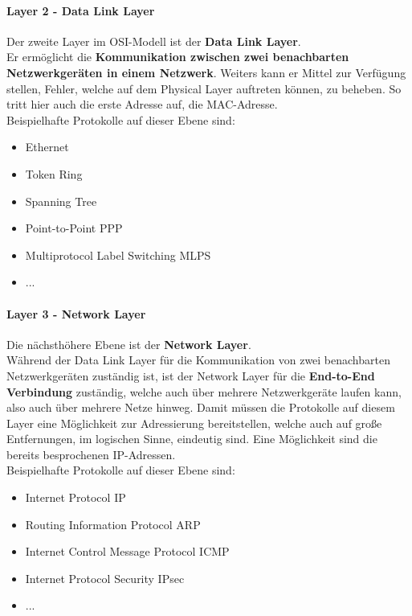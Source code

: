 \documentclass[12pt,a4paper]{report}
\begin{document}
\begin{onehalfspace}
\paragraph{Layer 2 - Data Link Layer}
Der zweite Layer im OSI-Modell ist der \textbf{Data Link Layer}.\\
Er ermöglicht die \textbf{Kommunikation zwischen zwei benachbarten Netzwerkgeräten in einem Netzwerk}. Weiters kann er Mittel zur Verfügung stellen, Fehler, welche auf dem Physical Layer auftreten können, zu beheben. So tritt hier auch die erste Adresse auf, die MAC-Adresse.\\

Beispielhafte Protokolle auf dieser Ebene sind:
\begin{itemize}
\item Ethernet
\item Token Ring
\item Spanning Tree 
\item Point-to-Point PPP
\item Multiprotocol Label Switching MLPS
\item ...
\end{itemize}
\paragraph{Layer 3 - Network Layer}
Die nächsthöhere Ebene ist der \textbf{Network Layer}.\\
Während der Data Link Layer für die Kommunikation von zwei benachbarten Netzwerkgeräten zuständig ist, ist der Network Layer für die \textbf{End-to-End Verbindung} zuständig, welche auch über mehrere Netzwerkgeräte laufen kann, also auch über mehrere Netze hinweg. Damit müssen die Protokolle auf diesem Layer eine Möglichkeit zur Adressierung bereitstellen, welche auch auf große Entfernungen, im logischen Sinne, eindeutig sind. Eine Möglichkeit sind die bereits besprochenen IP-Adressen.\\

Beispielhafte Protokolle auf dieser Ebene sind:
\begin{itemize}
\item Internet Protocol IP
\item Routing Information Protocol ARP
\item Internet Control Message Protocol ICMP
\item Internet Protocol Security IPsec
\item ...
\end{itemize}


\end{onehalfspace}
\end{document}
